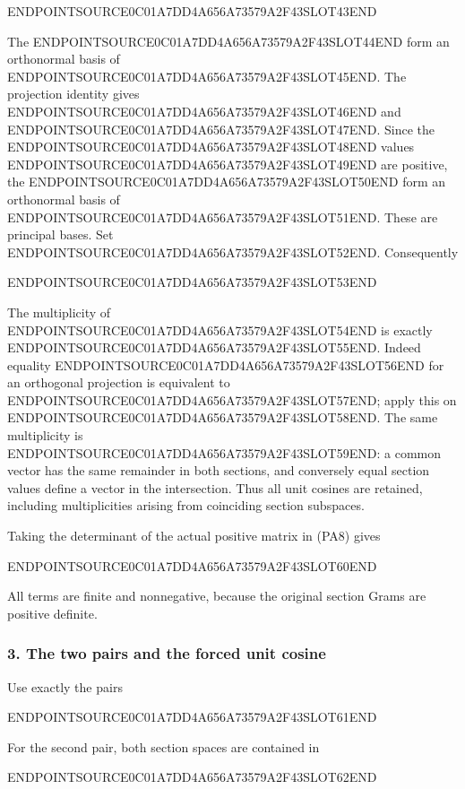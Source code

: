 ENDPOINTSOURCE0C01A7DD4A656A73579A2F43SLOT43END

The ENDPOINTSOURCE0C01A7DD4A656A73579A2F43SLOT44END form an orthonormal basis of ENDPOINTSOURCE0C01A7DD4A656A73579A2F43SLOT45END. The projection identity gives ENDPOINTSOURCE0C01A7DD4A656A73579A2F43SLOT46END and ENDPOINTSOURCE0C01A7DD4A656A73579A2F43SLOT47END. Since the ENDPOINTSOURCE0C01A7DD4A656A73579A2F43SLOT48END values ENDPOINTSOURCE0C01A7DD4A656A73579A2F43SLOT49END are positive, the ENDPOINTSOURCE0C01A7DD4A656A73579A2F43SLOT50END form an orthonormal basis of ENDPOINTSOURCE0C01A7DD4A656A73579A2F43SLOT51END. These are principal bases. Set ENDPOINTSOURCE0C01A7DD4A656A73579A2F43SLOT52END. Consequently

ENDPOINTSOURCE0C01A7DD4A656A73579A2F43SLOT53END

The multiplicity of ENDPOINTSOURCE0C01A7DD4A656A73579A2F43SLOT54END is exactly ENDPOINTSOURCE0C01A7DD4A656A73579A2F43SLOT55END. Indeed equality ENDPOINTSOURCE0C01A7DD4A656A73579A2F43SLOT56END for an orthogonal projection is equivalent to ENDPOINTSOURCE0C01A7DD4A656A73579A2F43SLOT57END; apply this on ENDPOINTSOURCE0C01A7DD4A656A73579A2F43SLOT58END. The same multiplicity is ENDPOINTSOURCE0C01A7DD4A656A73579A2F43SLOT59END: a common vector has the same remainder in both sections, and conversely equal section values define a vector in the intersection. Thus all unit cosines are retained, including multiplicities arising from coinciding section subspaces.

Taking the determinant of the actual positive matrix in (PA8) gives

ENDPOINTSOURCE0C01A7DD4A656A73579A2F43SLOT60END

All terms are finite and nonnegative, because the original section Grams are positive definite.

\subsubsection{3. The two pairs and the forced unit cosine}\label{endpoint-principal_angle_volume_review--the-two-pairs-and-the-forced-unit-cosine}

Use exactly the pairs

ENDPOINTSOURCE0C01A7DD4A656A73579A2F43SLOT61END

For the second pair, both section spaces are contained in

ENDPOINTSOURCE0C01A7DD4A656A73579A2F43SLOT62END

